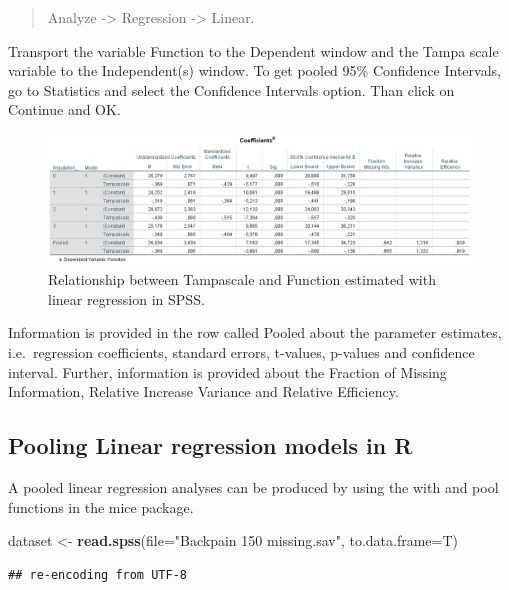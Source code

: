 \documentclass[]{book}
\newenvironment{Shaded}{\begin{snugshade}}{\end{snugshade}}
\newcommand{\KeywordTok}[1]{\textcolor[rgb]{0.13,0.29,0.53}{\textbf{#1}}}
\newcommand{\DataTypeTok}[1]{\textcolor[rgb]{0.13,0.29,0.53}{#1}}
\newcommand{\StringTok}[1]{\textcolor[rgb]{0.31,0.60,0.02}{#1}}
\newcommand{\NormalTok}[1]{#1}
\begin{document}
\begin{quote}
Analyze -\textgreater{} Regression -\textgreater{} Linear.
\end{quote}

Transport the variable Function to the Dependent window and the Tampa
scale variable to the Independent(s) window. To get pooled 95\%
Confidence Intervals, go to Statistics and select the Confidence
Intervals option. Than click on Continue and OK.

\begin{figure}

{\centering \includegraphics[width=0.9\linewidth]{images/table5.8} 

}

\caption{Relationship between Tampascale and Function estimated with linear regression in SPSS.}\label{fig:tab5-8}
\end{figure}

Information is provided in the row called Pooled about the parameter
estimates, i.e.~regression coefficients, standard errors, t-values,
p-values and confidence interval. Further, information is provided about
the Fraction of Missing Information, Relative Increase Variance and
Relative Efficiency.

\subsection{Pooling Linear regression models in
R}\label{pooling-linear-regression-models-in-r}

A pooled linear regression analyses can be produced by using the with
and pool functions in the mice package.

\begin{Shaded}
\begin{Highlighting}[]
\NormalTok{dataset <-}\StringTok{ }\KeywordTok{read.spss}\NormalTok{(}\DataTypeTok{file=}\StringTok{"Backpain 150 missing.sav"}\NormalTok{, }\DataTypeTok{to.data.frame=}\NormalTok{T)}
\end{Highlighting}
\end{Shaded}

\begin{verbatim}
## re-encoding from UTF-8
\end{verbatim}
\end{document}

